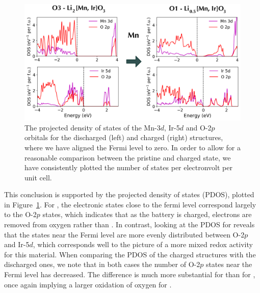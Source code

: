 \begin{refsection}
\begin{figure}[h] 
\centering 
\includegraphics[width=\textwidth]{Figures/batteries/charge_pdos_Mn_Ir.png} 
\caption{The projected density of states of the Mn-3$d$, Ir-5$d$ and O-2$p$ 
orbitals for the discharged (left) and charged (right) structures, where we 
have aligned the Fermi level to zero. In order to allow for a reasonable 
comparison between the pristine and charged state, we have consistently 
plotted the number of states per electronvolt per unit cell.} 
\label{batteries:fig-charge_pdos_Mn_Ir} 
\end{figure} 
 
This conclusion is supported by the projected density of states (PDOS), 
plotted in Figure~\ref{batteries:fig-charge_pdos_Mn_Ir}. For , the 
electronic states close to the fermi level correspond largely to the O-2$p$ 
states, which indicates that as the battery is charged, electrons are removed 
from oxygen rather than . In contrast, looking at the PDOS for 
 reveals that the states near the Fermi level are more evenly 
distributed between O-2$p$ and Ir-5$d$, which corresponds well to the picture 
of a more mixed redox activity for this material. When comparing the PDOS of 
the charged structures with the discharged ones, we note that in both cases 
the number of O-2$p$ states near the Fermi level has decreased. The difference 
is much more substantial for  than for , once again 
implying a larger oxidation of oxygen for . 
 
 
 \label{batteries:sec-dimer} 
 

\end{refsection}
